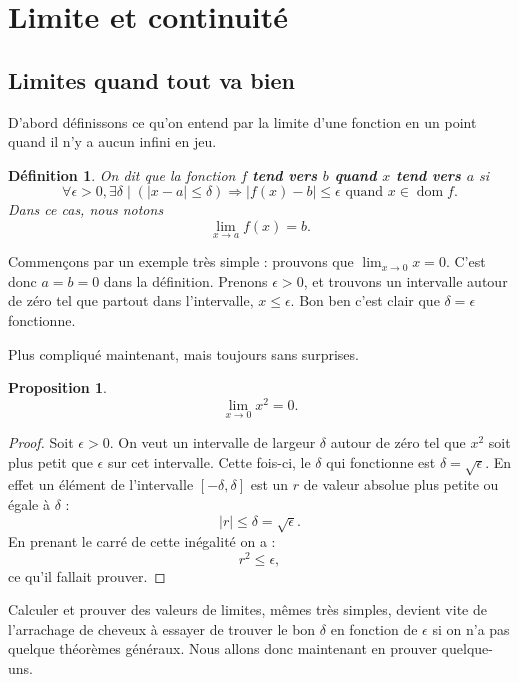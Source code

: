\documentclass[a4paper,12pt]{book}
\DeclareMathOperator{\dom}{dom}
\newcounter{numtho}
\theoremstyle{mes_exemples}	\newtheorem{exemple}[numtho]{Exemple}
\theoremstyle{mes_tho}
\newtheorem{proposition}[numtho]{Proposition}
\newtheorem{definition}[numtho]{Définition}
\newcommand{\defe}[2]{\textbf{#1}\index{#2}}
\newcommand{\tq}{\mid}
\begin{document}
\section{Limite et continuité}


\subsection{Limites quand tout va bien}

D'abord définissons ce qu'on entend par la limite d'une fonction en un point quand il n'y a aucun infini en jeu.
\begin{definition}		\label{DefLimPointSansInfini}
 On dit que la fonction $f$ \defe{tend vers $b$ quand $x$ tend vers $a$}{} si 
\[ 
  \forall \epsilon>0,\exists\delta\tq (| x-a |\leq\delta)\Rightarrow | f(x)-b |\leq \epsilon\text{ quand $x\in\dom f$}.
\]
Dans ce cas, nous notons
\begin{equation}
\lim_{x\to a}f(x)=b.
\end{equation} 
\end{definition}

Commençons par un exemple très simple : prouvons que $\lim_{x\to 0}x=0$. C'est donc $a=b=0$ dans la définition. Prenons $\epsilon>0$, et trouvons un intervalle autour de zéro tel que partout dans l'intervalle, $x\leq \epsilon$. Bon ben c'est clair que $\delta=\epsilon$ fonctionne.

Plus compliqué maintenant, mais toujours sans surprises.

\begin{proposition}
\[ 
  \lim_{x\to 0}x^2=0.
\]

\end{proposition}

\begin{proof}
Soit $\epsilon>0$. On veut un intervalle de largeur $\delta$ autour de zéro tel que $x^2$ soit plus petit que $\epsilon$ sur cet intervalle. Cette fois-ci, le $\delta$ qui fonctionne est $\delta=\sqrt{\epsilon}$. En effet un élément de l'intervalle $[-\delta,\delta]$ est un $r$ de valeur absolue plus petite ou égale à $\delta$ : 
\[ 
| r |\leq\delta=\sqrt{\epsilon}.
\]
En prenant le carré de cette inégalité on a :
\[ 
  r^2\leq\epsilon,
\]
ce qu'il fallait prouver.
\end{proof}


Calculer et prouver des valeurs de limites, mêmes très simples, devient vite de l'arrachage de cheveux à essayer de trouver le bon $\delta$ en fonction de $\epsilon$ si on n'a pas quelque théorèmes généraux. Nous allons donc maintenant en prouver quelque-uns.
\end{document}

